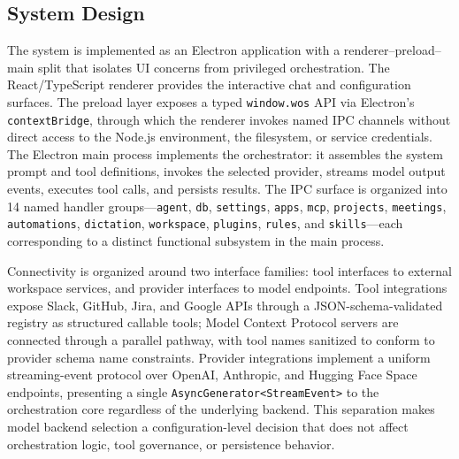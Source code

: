 \documentclass[conference]{IEEEtran}
\begin{document}
\subsection{System Design}

The system is implemented as an Electron application with a renderer--preload--main split that isolates UI concerns from privileged orchestration. The React/TypeScript renderer provides the interactive chat and configuration surfaces. The preload layer exposes a typed \texttt{window.wos} API via Electron's \texttt{contextBridge}, through which the renderer invokes named IPC channels without direct access to the Node.js environment, the filesystem, or service credentials. The Electron main process implements the orchestrator: it assembles the system prompt and tool definitions, invokes the selected provider, streams model output events, executes tool calls, and persists results. The IPC surface is organized into 14 named handler groups---\texttt{agent}, \texttt{db}, \texttt{settings}, \texttt{apps}, \texttt{mcp}, \texttt{projects}, \texttt{meetings}, \texttt{automations}, \texttt{dictation}, \texttt{workspace}, \texttt{plugins}, \texttt{rules}, and \texttt{skills}---each corresponding to a distinct functional subsystem in the main process.

Connectivity is organized around two interface families: tool interfaces to external workspace services, and provider interfaces to model endpoints. Tool integrations expose Slack, GitHub, Jira, and Google APIs through a JSON-schema-validated registry as structured callable tools; Model Context Protocol servers are connected through a parallel pathway, with tool names sanitized to conform to provider schema name constraints. Provider integrations implement a uniform streaming-event protocol over OpenAI, Anthropic, and Hugging Face Space endpoints, presenting a single \texttt{AsyncGenerator<StreamEvent>} to the orchestration core regardless of the underlying backend. This separation makes model backend selection a configuration-level decision that does not affect orchestration logic, tool governance, or persistence behavior.
\end{document}
